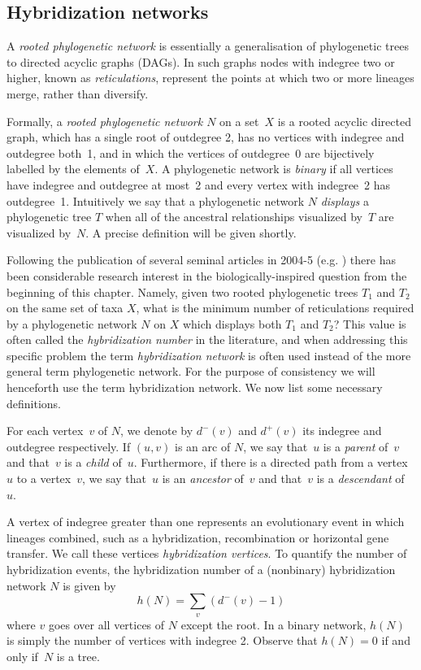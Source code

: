 \subsection*{Hybridization networks}
A \emph{rooted phylogenetic network} is essentially a generalisation of phylogenetic trees to directed acyclic graphs (DAGs). In such graphs nodes with indegree two or higher, known as \emph{reticulations}, represent the points at which two or more lineages merge, rather than diversify. 

Formally, a {\it rooted phylogenetic network $N$} on a set~$X$ is a rooted acyclic directed graph, which has a single root of outdegree 2, has no vertices with indegree and outdegree both~1, and in which the vertices of outdegree~0 are bijectively labelled by the elements of~$X$. A phylogenetic network is \emph{binary} if all vertices have indegree and outdegree at most~2 and every vertex with indegree~2 has outdegree~1. Intuitively we say that a phylogenetic network $N$ \emph{displays} a phylogenetic tree $T$ when all of the ancestral relationships visualized by~$T$ are visualized by~$N$. A precise definition will be given shortly. 

Following the publication of several seminal articles in 2004-5 (e.g. \cite{baroni05,BaroniEtAl2004}) there has been considerable research interest in the biologically-inspired question from the beginning of this chapter. Namely, given two rooted phylogenetic trees $T_1$ and $T_2$ on the same set of taxa $X$, what is the minimum number of reticulations required by a phylogenetic network $N$ on $X$ which displays both $T_1$ and $T_2$? This value is often called the \emph{hybridization number} in the literature, and when addressing this specific problem the term \emph{hybridization network} is often used instead of the more general term phylogenetic network. For the purpose of consistency we will henceforth use the term hybridization network. We now list some necessary definitions. 

For each vertex~$v$ of $N$, we denote by $d^-(v)$ and $d^+(v)$ its indegree and outdegree respectively. If $(u,v)$ is an arc of $N$, we say that~$u$ is a \emph{parent} of~$v$ and that~$v$ is a \emph{child} of~$u$. Furthermore, if there is a directed path from a vertex~$u$ to a vertex~$v$, we say that~$u$ is an \emph{ancestor} of~$v$ and that~$v$ is a \emph{descendant} of~$u$.

A vertex of indegree greater than one represents an evolutionary event in which lineages combined, such as a hybridization, recombination or horizontal gene transfer. We call these vertices \emph{hybridization vertices}. To quantify the number of hybridization events, the {hybridization number} of a (nonbinary) hybridization network $N$ is given by
$$h(N)=\sum_{v}(d^-(v)-1)$$
where $v$ goes over all vertices of $N$ except the root.
In a binary network, $h(N)$ is simply the number of vertices with indegree 2. Observe that $h(N)=0$ if and only if~$N$ is a tree.


